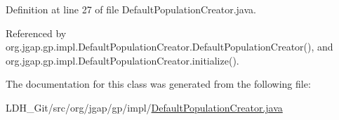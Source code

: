 Definition at line 27 of file Default\-Population\-Creator.\-java.



Referenced by org.\-jgap.\-gp.\-impl.\-Default\-Population\-Creator.\-Default\-Population\-Creator(), and org.\-jgap.\-gp.\-impl.\-Default\-Population\-Creator.\-initialize().



The documentation for this class was generated from the following file\-:\begin{DoxyCompactItemize}
\item 
L\-D\-H\-\_\-\-Git/src/org/jgap/gp/impl/\hyperlink{_default_population_creator_8java}{Default\-Population\-Creator.\-java}\end{DoxyCompactItemize}
